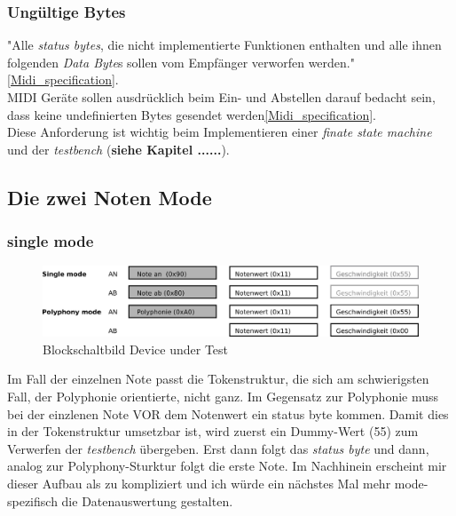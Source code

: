 \subsubsection*{Ungültige Bytes}
"Alle \textit{status bytes}, die nicht implementierte Funktionen enthalten und alle ihnen folgenden \textit{Data Byte}s sollen vom Empfänger verworfen werden."\ref{Midi_specification}.\\ MIDI Geräte sollen ausdrücklich beim Ein- und Abstellen darauf bedacht sein, dass keine undefinierten Bytes gesendet werden\ref{Midi_specification}.\\
Diese Anforderung ist wichtig beim Implementieren einer \textit{finate state machine} und der \textit{testbench} (\textbf{siehe Kapitel ......}). \\

\subsection{Die zwei Noten Mode}\label{note_modes}
\subsubsection{single mode}
\begin{figure}[H]
	\centering
	\includegraphics[width=1\textwidth]{images/midi_interface/MIDI_Spezifikation.png}
	\caption{Blockschaltbild Device under Test}
	\label{fig.testbench_single_Mode}
\end{figure}

Im Fall der einzelnen Note passt die Tokenstruktur, die sich am schwierigsten Fall, der Polyphonie orientierte, nicht ganz. Im Gegensatz zur Polyphonie muss bei der einzlenen Note VOR dem Notenwert ein status byte kommen. Damit dies in der Tokenstruktur umsetzbar ist, wird zuerst ein Dummy-Wert (55) zum Verwerfen der \textit{testbench} übergeben. Erst dann folgt das \textit{status byte} und dann, analog zur Polyphony-Sturktur folgt die erste Note. Im Nachhinein erscheint mir dieser Aufbau als zu kompliziert und ich würde ein nächstes Mal mehr mode-spezifisch die Datenauswertung gestalten.


